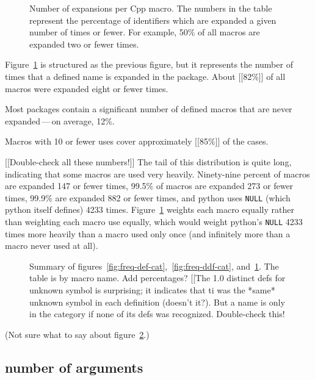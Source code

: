\documentclass[10pt]{article}
\newcommand{\pkg}[1]{\textsf{#1}}
\begin{document}
\begin{figure}
\centerline{}
\caption{Number of expansions per Cpp macro.  The numbers in the
  table represent the percentage of identifiers which are expanded a given
  number of times or fewer.  For example, 50\% of all
  macros are expanded two or fewer times.}
\label{fig:freq-use-cat}
\end{figure}

Figure~\ref{fig:freq-use-cat} is structured as the previous figure, but it
represents the number of times that a defined name is expanded in 
the package.  About [[82\%]] of all macros were
expanded eight or fewer times.

Most packages contain a significant number of defined
macros that are never expanded\,---\,on average, 12\%.

Macros with 10 or fewer uses
cover approximately [[85\%]] of the cases.

[[Double-check all these numbers!]]
The tail of this distribution is quite long, indicating that some macros
are used very heavily.  Ninety-nine percent of macros are expanded 147 or fewer
times, 99.5\% of macros are expanded 273 or fewer times, 99.9\% are
expanded 882 or fewer times, and \pkg{python} uses {\tt NULL} (which \pkg{python}
itself defines) 4233 times.  Figure~\ref{fig:freq-use-cat} weights each macro
equally rather than weighting each macro use equally, which would weight
\pkg{python}'s {\tt NULL} 4233 times more heavily than a macro used only once
(and infinitely more than a macro never used at all).

\begin{figure}
  {\small\centerline{}}
  
  \caption{Summary of
    figures~\ref{fig:freq-def-cat},~\ref{fig:freq-ddf-cat},
    and~\ref{fig:freq-use-cat}.  The table is by macro name.  Add percentages?
    [[The 1.0 distinct defs for unknown symbol is surprising; it indicates
    that ti was the *same* unknown symbol in each definition (doesn't
    it?).  But a name is only in the category if none of its defs was
    recognized.  Double-check this!}
  \label{fig:freq-sum-cat}
\end{figure}

(Not sure what to say about figure~\ref{fig:freq-sum-cat}.)

\subsection{number of arguments}
\end{document}
